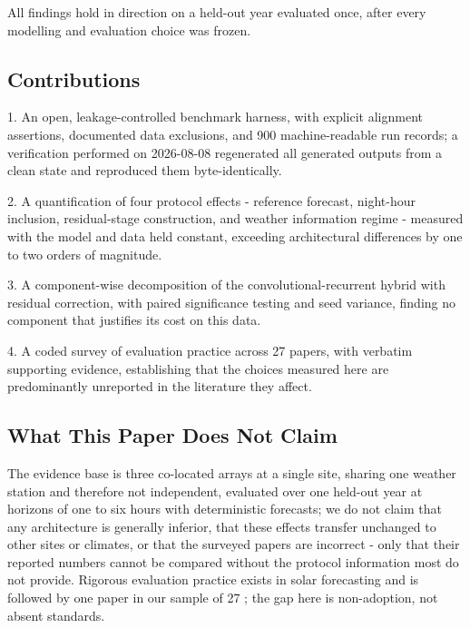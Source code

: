 All findings hold in direction on a held-out year evaluated once, after
every modelling and evaluation choice was frozen.

\subsection{Contributions}
\label{sec:intro-contributions}

1. An open, leakage-controlled benchmark harness, with explicit
   alignment assertions, documented data exclusions, and 900
   machine-readable run records; a verification performed on
   2026-08-08 regenerated all generated outputs from a clean state and
   reproduced them byte-identically.

2. A quantification of four protocol effects - reference forecast,
   night-hour inclusion, residual-stage construction, and weather
   information regime - measured with the model and data held constant,
   exceeding architectural differences by one to two orders of
   magnitude.

3. A component-wise decomposition of the convolutional-recurrent hybrid
   with residual correction, with paired significance testing and seed
   variance, finding no component that justifies its cost on this data.

4. A coded survey of evaluation practice across 27 papers, with
   verbatim supporting evidence, establishing that the choices measured
   here are predominantly unreported in the literature they affect.

\subsection{What This Paper Does Not Claim}
\label{sec:intro-not-claim}

The evidence base is three co-located arrays at a single site, sharing
one weather station and therefore not independent, evaluated over one
held-out year at horizons of one to six hours with deterministic
forecasts; we do not claim that any architecture is generally inferior,
that these effects transfer unchanged to other sites or climates, or
that the surveyed papers are incorrect - only that their reported
numbers cannot be compared without the protocol information most do not
provide. Rigorous evaluation practice exists in solar forecasting
\cite{yang2020verification, yang2019ropes} and is followed by one paper
in our sample of 27 \cite{mayer2022physmlhybrid}; the gap here is
non-adoption, not absent standards.
